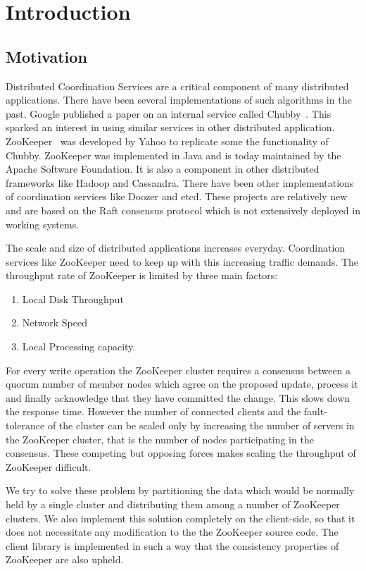 \chapter{Introduction}

\section{Motivation}

Distributed Coordination Services are a critical component of many distributed applications. There have been several implementations of such algorithms in the past. Google published a paper on an internal service called Chubby~\cite{burrows2006chubby}. This sparked an interest in using similar services in other distributed application. ZooKeeper~\cite{hunt2010zookeeper} was developed by Yahoo to replicate some the functionality of Chubby. ZooKeeper was implemented in Java and is today maintained by the Apache Software Foundation. It is also a component in other distributed frameworks like Hadoop and Cassandra. There have been other implementations of coordination services like Doozer and etcd. These projects are relatively new and are based on the Raft consensus protocol which is not extensively deployed in working systems. 

The scale and size of distributed applications increases everyday. Coordination services like ZooKeeper need to keep up with this increasing traffic demands. The throughput rate of ZooKeeper is limited by three main factors:

\begin{enumerate}
	\item Local Disk Throughput
	\item Network Speed
	\item Local Processing capacity.
\end{enumerate}

For every write operation the ZooKeeper cluster requires a consensus between a quorum number of member nodes which agree on the proposed update, process it and finally acknowledge that they have committed the change. This slows down the response time. However the number of connected clients and the fault-tolerance of the cluster can be scaled only by increasing the number of servers in the ZooKeeper cluster, that is the number of nodes participating in the consensus. These competing but opposing forces makes scaling the throughput of ZooKeeper difficult. 

We try to solve these problem by partitioning the data which would be normally held by a single cluster and distributing them among a number of ZooKeeper clusters. We also implement this solution completely on the client-side, so that it does not necessitate any modification to the the ZooKeeper source code. The client library is implemented in such a way that the consistency properties of ZooKeeper are also upheld.


